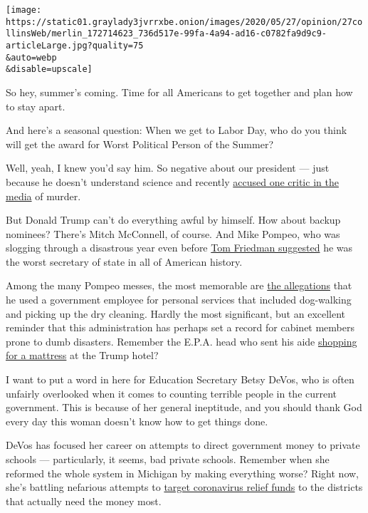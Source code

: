 \texttt{[image: https://static01.graylady3jvrrxbe.onion/images/2020/05/27/opinion/27collinsWeb/merlin\_172714623\_736d517e-99fa-4a94-ad16-c0782fa9d9c9-articleLarge.jpg?quality=75\\\&auto=webp\\\&disable=upscale]}

So hey, summer's coming. Time for all Americans to get together and plan
how to stay apart.

And here's a seasonal question: When we get to Labor Day, who do you
think will get the award for Worst Political Person of the Summer?

Well, yeah, I knew you'd say him. So negative about our president ---
just because he doesn't understand science and recently
\href{https://www.nytimes3xbfgragh.onion/2020/05/26/us/politics/klausutis-letter-jack-dorsey.html}{accused
one critic in the media} of murder.

But Donald Trump can't do everything awful by himself. How about backup
nominees? There's Mitch McConnell, of course. And Mike Pompeo, who was
slogging through a disastrous year even before
\href{https://www.nytimes3xbfgragh.onion/2020/05/26/opinion/mike-pompeo.html}{Tom
Friedman suggested} he was the worst secretary of state in all of
American history.

Among the many Pompeo messes, the most memorable are
\href{https://www.nytimes3xbfgragh.onion/2020/05/17/us/politics/pompeo-inspector-general-steve-linick.html}{the
allegations} that he used a government employee for personal services
that included dog-walking and picking up the dry cleaning. Hardly the
most significant, but an excellent reminder that this administration has
perhaps set a record for cabinet members prone to dumb disasters.
Remember the E.P.A. head who sent his aide
\href{https://www.nytimes3xbfgragh.onion/2018/06/04/climate/pruitt-epa-apartment-aide.html}{shopping
for a mattress} at the Trump hotel?

I want to put a word in here for Education Secretary Betsy DeVos, who is
often unfairly overlooked when it comes to counting terrible people in
the current government. This is because of her general ineptitude, and
you should thank God every day this woman doesn't know how to get things
done.

DeVos has focused her career on attempts to direct government money to
private schools --- particularly, it seems, bad private schools.
Remember when she reformed the whole system in Michigan by making
everything worse? Right now, she's battling nefarious attempts to
\href{https://www.nytimes3xbfgragh.onion/2020/05/15/us/politics/betsy-devos-coronavirus-religious-schools.html}{target
coronavirus relief funds} to the districts that actually need the money
most.

